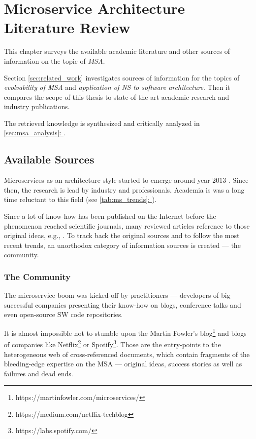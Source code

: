 \documentclass[thesis=M,english,hidelinks]{FITthesis}[2012/10/20]
\newcommand*{\fullref}[1]{\hyperref[{#1}]{\autoref*{#1}: \textit{\nameref*{#1}}}}
\begin{document}
\chapter{Microservice Architecture Literature Review}
\label{sec:literature_review}
This chapter surveys the available academic literature and other sources of information on the topic of \textit{\acrlong{MSA}}.

Section \ref{sec:related_work} investigates sources of information for the topics of \textit{evolvability of \acrlong{MSA}} and \textit{application of \acrlong{NS} to software architecture}. Then it compares the scope of this thesis to state-of-the-art academic research and industry publications.

The retrieved knowledge is synthesized and critically analyzed in \fullref{sec:msa_analysis}.

% 
% 
\section{Available Sources}
Microservices as an architecture style started to emerge around year 2013 \cite{ms-fow-new-term-def}. Since then, the research is lead by industry and professionals. Academia is was a long time reluctant to this field (see \fullref{tab:ms_trends}).

Since a lot of know-how has been published on the Internet before the phenomenon reached scientific journals, many reviewed articles reference to those original ideas, e.g., \cite{ms-today-tomorrow, ms-taxonomy, ms-sc-collaborative-mdd, ms-sc-measuring}. To track back the original sources and to follow the most recent trends, an unorthodox category of information sources is created --- the community. 

\subsection{The Community}
The microservice boom was kicked-off by practitioners --- developers of big successful companies presenting their know-how on blogs, conference talks and even open-source \acrshort{SW} code repositories.

It is almost impossible not to stumble upon the Martin Fowler's blog\footnote{https://martinfowler.com/microservices/} and blogs of companies like Netflix\footnote{https://medium.com/netflix-techblog} or Spotify\footnote{https://labs.spotify.com/}. Those are the entry-points to the heterogeneous web of cross-referenced documents, which contain fragments of the bleeding-edge expertise on the \acrshort{MSA} --- original ideas, success stories as well as failures and dead ends.
\end{document}
